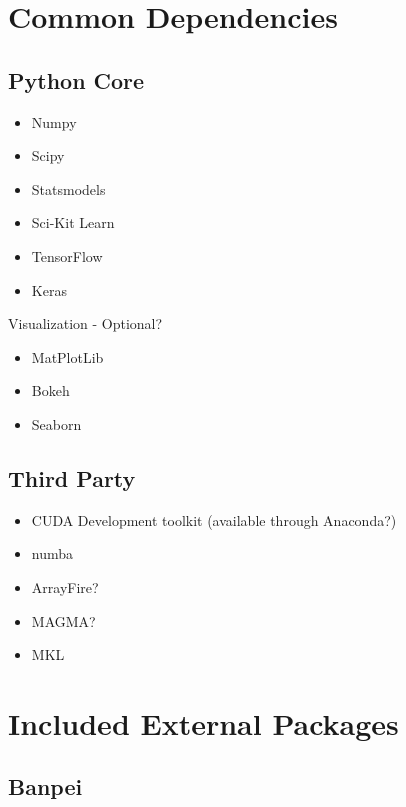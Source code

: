 \documentclass[10pt,a4paper]{report}
\begin{document}
	
	
\chapter{Common Dependencies}

\section{Python Core}
\begin{itemize}
\item Numpy
\item Scipy
\item Statsmodels
\item Sci-Kit Learn
\item TensorFlow
\item Keras
\end{itemize}


\begin{section}{Visualization - Optional?}
\begin{itemize}
\item MatPlotLib
\item Bokeh
\item Seaborn
\end{itemize}
\end{section}


\section{Third Party}

\begin{itemize}
\item CUDA Development toolkit (available through Anaconda?)
\item numba
\item ArrayFire?
\item MAGMA?
\item MKL
\end{itemize}







\chapter{Included External Packages}

\section{Banpei}
\end{document}
